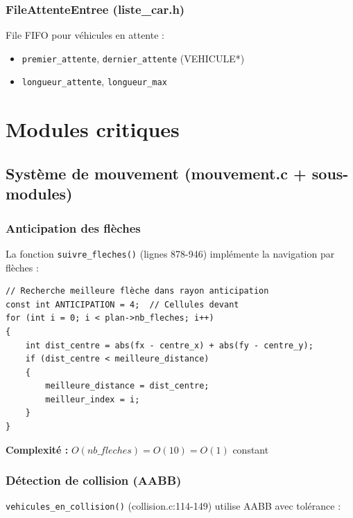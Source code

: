 \documentclass[12pt,a4paper]{article}
\begin{document}
\subsubsection{FileAttenteEntree (liste\_car.h)}

File FIFO pour véhicules en attente :

\begin{itemize}
    \item \texttt{premier\_attente}, \texttt{dernier\_attente} (VEHICULE*)
    \item \texttt{longueur\_attente}, \texttt{longueur\_max}
\end{itemize}


\section{Modules critiques}

\subsection{Système de mouvement (mouvement.c + sous-modules)}

\subsubsection{Anticipation des flèches}

La fonction \texttt{suivre\_fleches()} (lignes 878-946) implémente la navigation par flèches :

\begin{lstlisting}
// Recherche meilleure flèche dans rayon anticipation
const int ANTICIPATION = 4;  // Cellules devant
for (int i = 0; i < plan->nb_fleches; i++)
{
    int dist_centre = abs(fx - centre_x) + abs(fy - centre_y);
    if (dist_centre < meilleure_distance)
    {
        meilleure_distance = dist_centre;
        meilleur_index = i;
    }
}
\end{lstlisting}

\textbf{Complexité :} $O(nb\_fleches) = O(10) = O(1)$ constant

\subsubsection{Détection de collision (AABB)}

\texttt{vehicules\_en\_collision()} (collision.c:114-149) utilise AABB avec tolérance :
\end{document}
